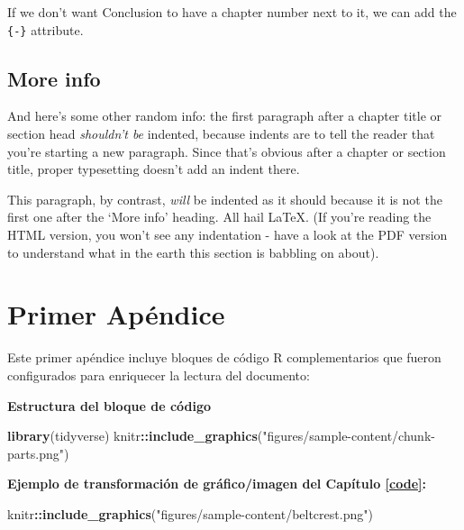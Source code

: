 \documentclass[a4paper, nobind]{templates/ociamthesis}
\newenvironment{Shaded}{\begin{snugshade}}{\end{snugshade}}
\newcommand{\FunctionTok}[1]{\textcolor[rgb]{0.13,0.29,0.53}{\textbf{#1}}}
\newcommand{\NormalTok}[1]{#1}
\newcommand{\SpecialCharTok}[1]{\textcolor[rgb]{0.81,0.36,0.00}{\textbf{#1}}}
\newcommand{\StringTok}[1]{\textcolor[rgb]{0.31,0.60,0.02}{#1}}
\renewenvironment{Shaded}
{
  \vspace{10pt}%
  \begin{snugshade}%
}{%
  \end{snugshade}%
  \vspace{8pt}%
}
\begin{document}
If we don't want Conclusion to have a chapter number next to it, we can add the \texttt{\{-\}} attribute.

\section*{More info}\label{more-info}

And here's some other random info:
the first paragraph after a chapter title or section head \emph{shouldn't be} indented, because indents are to tell the reader that you're starting a new paragraph.
Since that's obvious after a chapter or section title, proper typesetting doesn't add an indent there.

This paragraph, by contrast, \emph{will} be indented as it should because it is not the first one after the `More info' heading.
All hail LaTeX. (If you're reading the HTML version, you won't see any indentation - have a look at the PDF version to understand what in the earth this section is babbling on about).

\startappendices

\chapter{Primer Apéndice}\label{primer-apuxe9ndice}

Este primer apéndice incluye bloques de código R complementarios que fueron configurados para enriquecer la lectura del documento:

\textbf{Estructura del bloque de código}

\begin{Shaded}
\begin{Highlighting}[]
\FunctionTok{library}\NormalTok{(tidyverse)}
\NormalTok{knitr}\SpecialCharTok{::}\FunctionTok{include\_graphics}\NormalTok{(}\StringTok{"figures/sample{-}content/chunk{-}parts.png"}\NormalTok{)}
\end{Highlighting}
\end{Shaded}

\textbf{Ejemplo de transformación de gráfico/imagen del Capítulo \ref{code}:}

\begin{Shaded}
\begin{Highlighting}[]
\NormalTok{knitr}\SpecialCharTok{::}\FunctionTok{include\_graphics}\NormalTok{(}\StringTok{"figures/sample{-}content/beltcrest.png"}\NormalTok{)}
\end{Highlighting}
\end{Shaded}
\end{document}

